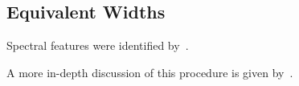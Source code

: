 \subsection{Equivalent Widths}


Spectral features were identified by~\cite{Rayner_2009}.  

A more in-depth discussion of this procedure is given by~\cite{Cushing_2005}.